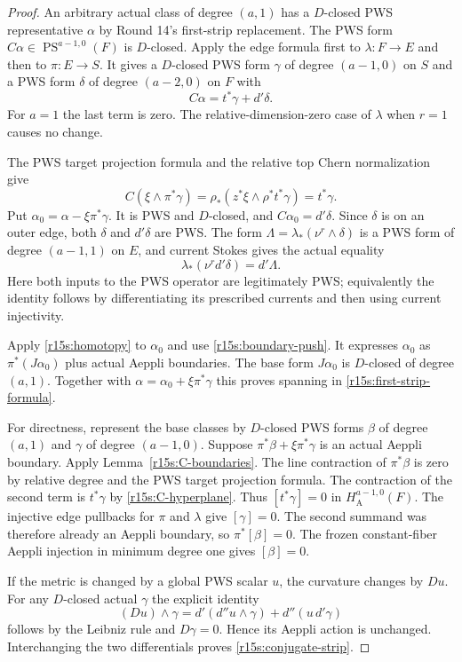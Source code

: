 \begin{proof}
An arbitrary actual class of degree $(a,1)$ has a
$D$-closed PWS representative $\alpha$ by Round 14's
first-strip replacement.  The PWS form
$C\alpha\in\operatorname{PS}^{a-1,0}(F)$ is $D$-closed.
Apply the edge formula first to $\lambda:F\to E$ and
then to $\pi:E\to S$.  It gives a $D$-closed PWS form
$\gamma$ of degree $(a-1,0)$ on $S$ and a PWS form
$\delta$ of degree $(a-2,0)$ on $F$ with
\[
                       C\alpha=t^*\gamma+d'\delta.
\tag{FS15.10}\label{r15s:C-decomposition}
\]
For $a=1$ the last term is zero.  The relative-dimension-zero
case of $\lambda$ when $r=1$ causes no change.

The PWS target projection formula and the relative top
Chern normalization give
\[
       C(\xi\wedge\pi^*\gamma)
          =\rho_*(z^*\xi\wedge\rho^*t^*\gamma)
          =t^*\gamma.
\tag{FS15.11}\label{r15s:C-hyperplane}
\]
Put $\alpha_0=\alpha-\xi\pi^*\gamma$.  It is PWS and
$D$-closed, and $C\alpha_0=d'\delta$.
Since $\delta$ is on an outer edge, both $\delta$ and
$d'\delta$ are PWS.  The form
$\Lambda=\lambda_*(\nu^r\wedge\delta)$ is a PWS
form of degree $(a-1,1)$ on $E$, and current Stokes gives
the actual equality
\[
                  \lambda_*(\nu^r d'\delta)=d'\Lambda.
\tag{FS15.12}\label{r15s:boundary-push}
\]
Here both inputs to the PWS operator are legitimately PWS;
equivalently the identity follows by differentiating its
prescribed currents and then using current injectivity.

Apply \eqref{r15s:homotopy} to $\alpha_0$ and use
\eqref{r15s:boundary-push}.  It expresses $\alpha_0$ as
$\pi^*(J\alpha_0)$ plus actual Aeppli boundaries.
The base form $J\alpha_0$ is $D$-closed of degree $(a,1)$.
Together with $\alpha=\alpha_0+\xi\pi^*\gamma$ this
proves spanning in \eqref{r15s:first-strip-formula}.

For directness, represent the base classes by $D$-closed
PWS forms $\beta$ of degree $(a,1)$ and $\gamma$ of
degree $(a-1,0)$.  Suppose
$\pi^*\beta+\xi\pi^*\gamma$ is an actual Aeppli boundary.
Apply Lemma~\ref{r15s:C-boundaries}.  The line contraction
of $\pi^*\beta$ is zero by relative degree and the PWS
target projection formula.  The contraction of the second
term is $t^*\gamma$ by \eqref{r15s:C-hyperplane}.
Thus $[t^*\gamma]=0$ in $H_{\mathrm A}^{a-1,0}(F)$.
The injective edge pullbacks for $\pi$ and $\lambda$
give $[\gamma]=0$.  The second summand was therefore
already an Aeppli boundary, so $\pi^*[\beta]=0$.
The frozen constant-fiber Aeppli injection in minimum
degree one gives $[\beta]=0$.

If the metric is changed by a global PWS scalar $u$, the
curvature changes by $Du$.  For any $D$-closed actual
$\gamma$ the explicit identity
\[
       (Du)\wedge\gamma
          =d'(d''u\wedge\gamma)+d''(u\,d'\gamma)
\tag{FS15.13}\label{r15s:metric-independence}
\]
follows by the Leibniz rule and $D\gamma=0$.
Hence its Aeppli action is unchanged.  Interchanging the
two differentials proves \eqref{r15s:conjugate-strip}.
\end{proof}

